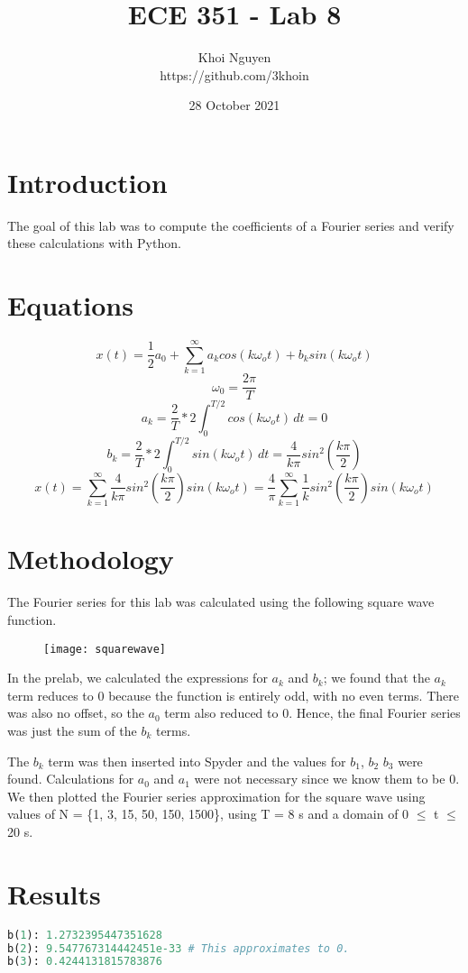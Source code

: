 \documentclass[11pt,a4,titlepage]{article}
\title{ECE 351 - Lab 8}
\author{Khoi Nguyen \\ https://github.com/3khoin}
\date{28 October 2021}
\begin{document}
\maketitle
\pagebreak

\tableofcontents
\pagebreak

\section{Introduction}
The goal of this lab was to compute the coefficients of a Fourier series and verify these calculations with Python.

\section{Equations}
\[x(t) = \frac{1}{2}a_{0} + \sum_{k=1}^{\infty}a_{k}cos(k\omega_{o}t) + b_{k}sin(k\omega_{o}t) \]
\[\omega _{0} = \frac{2\pi}{T}\]
\[a_{k} = \frac{2}{T}*2\int_{0}^{T/2} cos(k\omega_{o}t) \,dt = 0\]
\[b_{k} = \frac{2}{T}*2\int_{0}^{T/2} sin(k\omega_{o}t) \,dt = \frac{4}{k\pi}sin^2(\frac{k\pi}{2})\]
\[x(t) = \sum_{k=1}^{\infty} \frac{4}{k\pi}sin^2(\frac{k\pi}{2})sin(k\omega_{o}t) = \frac{4}{\pi}\sum_{k=1}^{\infty}\frac{1}{k}sin^2(\frac{k\pi}{2})sin(k\omega_{o}t)\]

\section{Methodology}
The Fourier series for this lab was calculated using the following square wave function.

\begin{figure}[H]
\centering
\texttt{[image: squarewave]}
\end{figure}

In the prelab, we calculated the expressions for $a_{k}$ and $b_{k}$; we found that the $a_{k}$ term reduces to 0 because the function is entirely odd, with no even terms. There was also no offset, so the $a_{0}$ term also reduced to 0. Hence, the final Fourier series was just the sum of the $b_{k}$ terms.

The $b_{k}$ term was then inserted into Spyder and the values for $b_{1}$, $b_{2}$ $b_{3}$ were found. Calculations for $a_{0}$ and $a_{1}$ were not necessary since we know them to be 0. We then plotted the Fourier series approximation for the square wave using values of N = \{1, 3, 15, 50, 150, 1500\}, using T = 8 s and a domain of 0 $\leq$ t $\leq$ 20 s.

\section{Results}
\begin{lstlisting}[language=Python]
b(1): 1.2732395447351628
b(2): 9.547767314442451e-33 # This approximates to 0.
b(3): 0.4244131815783876
\end{lstlisting}
\end{document}
